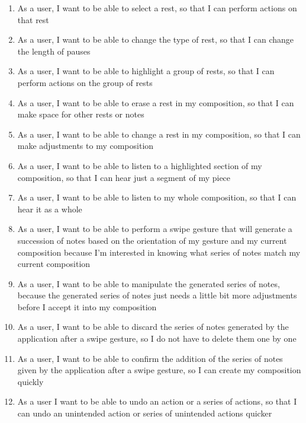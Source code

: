 \begin{enumerate}
\item As a user, I want to be able to select a rest, so that I can perform actions on that rest
\item As a user, I want to be able to change the type of rest, so that I can change the length of pauses
\item As a user, I want to be able to highlight a group of rests, so that I can perform actions on the group of rests
\item As a user, I want to be able to erase a rest in my composition, so that I can make space for other rests or notes
\item As a user, I want to be able to change a rest in my composition, so that I can make adjustments to my composition
\item As a user, I want to be able to listen to a highlighted section of my composition, so that I can hear just a segment of my piece
\item As a user, I want to be able to listen to my whole composition, so that I can hear it as a whole
\item As a user, I want to be able to perform a swipe gesture that will generate a succession of notes based on the orientation of my gesture and my current composition because I'm interested in knowing what series of notes match my current composition
\item As a user, I want to be able to manipulate the generated series of notes, because the generated series of notes just needs a little bit more adjustments before I accept it into my composition
\item As a user, I want to be able to discard the series of notes generated by the application after a swipe gesture, so I do not have to delete them one by one
\item As a user, I want to be able to confirm the addition of the series of notes given by the application after a swipe gesture, so I can create my composition quickly
\item As a user I want to be able to undo an action or a series of actions, so that I can undo an unintended action or series of unintended actions quicker

\end{enumerate}

